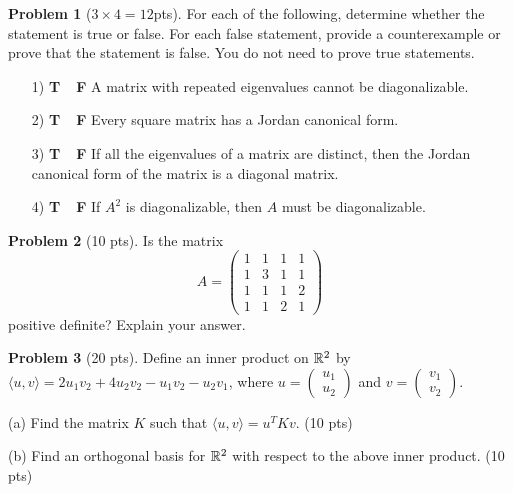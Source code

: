 \documentclass[12pt]{amsart}
\theoremstyle{definition}
\newtheorem{prob}{Problem}
\begin{document}
\begin{prob}[$3\times 4 = 12$pts]For each of the following, determine whether the statement is true or false. For
each false statement, provide a counterexample or prove that the statement is false. You do
not need to prove true statements.	\begin{enumerate}
		\item[1)  {\bf T\ \  F}]\quad   A matrix with repeated eigenvalues cannot be diagonalizable.
		\vspace{5cm}
		
		\item[2)  {\bf T\ \  F}]\quad Every square matrix has a Jordan canonical form.

\vspace{5cm}
		
		\item[3)  {\bf T\ \  F}]\quad If all the eigenvalues of a matrix are distinct, then the Jordan canonical form of the matrix is a diagonal matrix.\vspace{5cm}
		\item[4)  {\bf T\ \  F}]\quad If $A^2$ is diagonalizable, then $A$ must be diagonalizable.	\end{enumerate}
\end{prob}

\newpage

\begin{prob}[10 pts]
	Is the matrix
	$$A=\begin{pmatrix}
		1&1&1&1\\1&3&1&1\\1&1&1&2\\1&1&2&1
	\end{pmatrix}$$
	positive definite? Explain your answer.
\end{prob}

\newpage

\begin{prob}[20 pts]
	Define an inner product on $\mathbb{R}^2$ by $\langle u,v\rangle=2u_1v_2+4u_2v_2-u_1v_2-u_2v_1$, where $u=\begin{pmatrix}
		u_1\\u_2
	\end{pmatrix}$ and $v=\begin{pmatrix}
		v_1\\v_2
	\end{pmatrix}$. 
	
	(a) Find the matrix $K$ such that $\langle u,v\rangle = u^TKv$. (10 pts)\vspace{8cm}
	
		
	(b) Find an orthogonal basis for $\mathbb{R}^2$ with respect to the above inner product. (10 pts) 
	
	
\end{prob}
\end{document}
